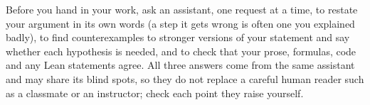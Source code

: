 Before you hand in your work, ask an assistant, one request at a time, to restate your argument in its own words (a step it gets wrong is often one you explained badly), to find counterexamples to stronger versions of your statement and say whether each hypothesis is needed, and to check that your prose, formulas, code and any Lean statements agree. All three answers come from the same assistant and may share its blind spots, so they do not replace a careful human reader such as a classmate or an instructor; check each point they raise yourself.
